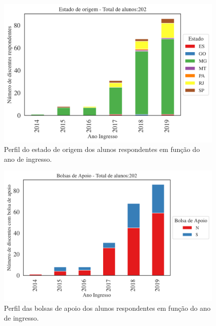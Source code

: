 \documentclass[a4paper,10pt]{article}
\begin{document}
\begin{figure}[h]
\centering
\includegraphics[width=0.85\linewidth]{quantitativos_estado_de_origem_116500.png}
\caption{\label{fig:estado_ano} Perfil do estado de origem dos alunos respondentes em função do ano de ingresso.}
\end{figure}

\begin{figure}[h]
\centering
\includegraphics[width=0.85\linewidth]{quantitativos_bolsa_de_apoio_116500.png}
\caption{\label{fig:bolsa_ano} Perfil das bolsas de apoio  dos alunos respondentes em função do ano de ingresso.}
\end{figure}
\end{document}
